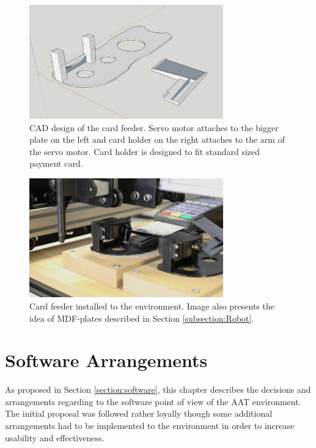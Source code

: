 \begin{figure}[ht]
  \begin{center}
    \includegraphics[width=8.4cm]{images/card_feeder.png}
    \caption{CAD design of the card feeder. Servo motor attaches to the bigger plate on the left and card holder on the right attaches to the arm of the servo motor. Card holder is designed to fit standard sized payment card.}
    \label{fig:card_feeder}
  \end{center}
\end{figure}

\begin{figure}[ht]
  \begin{center}
    \includegraphics[width=8.4cm]{images/card_feeder_2.jpg}
    \caption{Card feeder installed to the environment. Image also presents the idea of MDF-plates described in Section \ref{subsection:Robot}.}
    \label{fig:card_feeder_2}
  \end{center}
\end{figure}
\FloatBarrier

\section{Software Arrangements}
\label{section:Software arrangements}

As proposed in Section \ref{section:software}, this chapter describes the decisions and arrangements regarding to the software point of view of the AAT environment. The initial proposal was followed rather loyally though some additional arrangements had to be implemented to the environment in order to increase usability and effectiveness.

